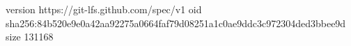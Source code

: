version https://git-lfs.github.com/spec/v1
oid sha256:84b520e9e0a42aa92275a0664faf79d08251a1c0ae9ddc3c972304ded3bbee9d
size 131168
